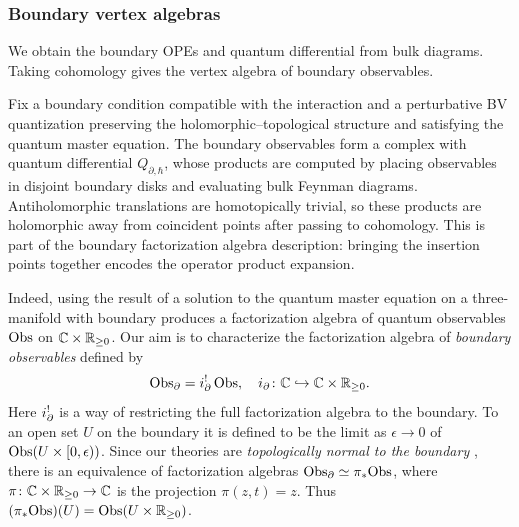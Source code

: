 \documentclass[11pt]{amsart}
\numberwithin{equation}{section}
\numberwithin{figure}{section}
\numberwithin{table}{section}
\begin{document}
\subsubsection{Boundary vertex algebras}\label{sec:BoundaryVertexAlgebras}
We obtain the boundary OPEs and quantum differential from bulk diagrams.
Taking cohomology gives the vertex algebra of boundary observables.


Fix a boundary condition compatible with the interaction and a perturbative BV quantization preserving the
holomorphic--topological structure and satisfying the quantum master equation.
The boundary observables form a complex with quantum differential $Q_{\partial,\hbar}$, whose products are computed by placing observables in disjoint boundary disks and evaluating bulk Feynman diagrams.
Antiholomorphic translations are homotopically trivial, so these products are holomorphic away from coincident points after passing to cohomology.
This is part of the boundary factorization algebra description: bringing the insertion points together encodes the operator
product expansion.

Indeed, using the result of \cite{EugeneThesis} a solution to the quantum master equation on a three-manifold with boundary produces a factorization algebra of quantum observables $\operatorname{Obs}$ on ${\mathbb C} \times {\mathbb R}_{\geq 0}$.
Our aim is to characterize the factorization algebra of \textit{boundary observables} defined by 
\begin{equation}\label{eq:BoundaryObservables}
  \operatorname{Obs}_{\partial} = i_{\partial}^! \operatorname{Obs} , \quad i_{\partial} \colon {\mathbb C} \hookrightarrow {\mathbb C} \times {\mathbb R}_{\geq 0} .
\end{equation}
Here $i^!_{\partial}$ is a way of restricting the full factorization algebra to the boundary.
To an open set $U$ on the boundary it is defined to be the limit as $\epsilon \to 0$ of $\text{Obs}(U \times [0,\epsilon))$. 
Since our theories are \textit{topologically normal to the boundary} \cite{EugeneThesis}, there is an equivalence of
factorization algebras $\text{Obs}_{\partial} \simeq \pi_* \text{Obs}$, where
$\pi\colon{\mathbb C}\times{\mathbb R}_{\geq0}\to{\mathbb C}$ is the projection $\pi(z,t)=z$.
Thus $(\pi_*\text{Obs})(U)=\text{Obs}(U\times{\mathbb R}_{\geq0})$.
\end{document}
